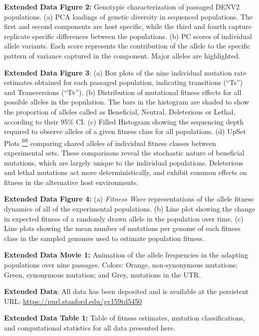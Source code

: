 \documentclass[
]{article}
\begin{document}
\textbf{Extended Data Figure 2:} Genotypic characterization of passaged
DENV2 populations. (a) PCA loadings of genetic diversity in sequenced
populations. The first and second components are host specific, while
the third and fourth capture replicate specific differences between the
populations. (b) PC scores of individual allele variants. Each score
represents the contribution of the allele to the specific pattern of
variance captured in the component. Major alleles are highlighted.

\textbf{Extended Data Figure 3}: (a) Box plots of the nine individual
mutation rate estimates obtained for each passaged population,
indicating transitions (``Ts'') and Transversions (``Tv''). (b)
Distribution of mutational fitness effects for all possible alleles in
the population. The bars in the histogram are shaded to show the
proportion of alleles called as Beneficial, Neutral, Deleterious or
Lethal, according to their 95\% CI. (c) Filled Histogram showing the
sequencing depth required to observe alleles of a given fitness class
for all populations. (d) UpSet Plots
\href{https://paperpile.com/c/REZjPf/PH7pe}{\textsuperscript{68}}
comparing shared alleles of individual fitness classes between
experimental sets. These comparisons reveal the stochastic nature of
beneficial mutations, which are largely unique to the individual
populations. Deleterious and lethal mutations act more
deterministically, and exhibit common effects on fitness in the
alternative host environments.

\textbf{Extended Data Figure 4:} (a) \emph{Fitness Wave} representations
of the allele fitness dynamics of all of the experimental populations.
(b) Line plot showing the change in expected fitness of a randomly drawn
allele in the population over time. (c) Line plots showing the mean
number of mutations per genome of each fitness class in the sampled
genomes used to estimate population fitness.

\textbf{Extended Data Movie 1:} Animation of the allele frequencies in
the adapting populations over nine passages. Colors: Orange,
non-synonymous mutations; Green, synonymous mutation; and Grey,
mutations in the UTR.

\textbf{Extended Data}: All data has been deposited and is available at
the persistent URL: \url{https://purl.stanford.edu/gv159td5450}

\textbf{Extended Data Table 1:} Table of fitness estimates, mutation
classifications, and computational statistics for all data presented
here.
\end{document}
